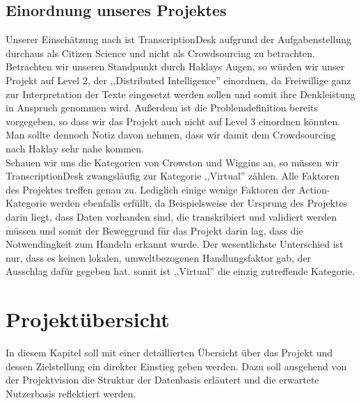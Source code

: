 \documentclass{article}
\begin{document}
\subsection{Einordnung unseres Projektes}
Unserer Einschätzung nach ist TranscriptionDesk aufgrund der Aufgabenstellung durchaus als Citizen Science und nicht als Crowdsourcing zu betrachten. Betrachten wir unseren Standpunkt durch Haklays Augen, so würden wir unser Projekt auf Level 2, der ,,Distributed Intelligence'' einordnen, da Freiwillige ganz zur Interpretation der Texte eingesetzt werden sollen und somit ihre Denkleistung in Anspruch genommen wird. Außerdem ist die Problemdefinition bereits vorgegeben, so dass wir das Projekt auch nicht auf Level 3 einordnen könnten. Man sollte dennoch Notiz davon nehmen, dass wir damit dem Crowdsourcing nach Haklay sehr nahe kommen.\\
Schauen wir uns die Kategorien von Crowston und Wiggins an, so müssen wir TranscriptionDesk zwangsläufig zur Kategorie ,,Virtual'' zählen. Alle Faktoren des Projektes treffen genau zu. Lediglich einige wenige Faktoren der Action-Kategorie werden ebenfalls erfüllt, da Beispielsweise der Ursprung des Projektes darin liegt, dass Daten vorhanden sind, die transkribiert und validiert werden müssen und somit der Beweggrund für das Projekt darin lag, dass die Notwendingkeit zum Handeln erkannt wurde. Der wesentlichste Unterschied ist nur, dass es keinen lokalen, umweltbezogenen Handlungsfaktor gab, der Ausschlag dafür gegeben hat. somit ist ,,Virtual'' die einzig zutreffende Kategorie.

\section{Projektübersicht}
In diesem Kapitel soll mit einer detaillierten Übersicht über das Projekt und dessen Zielstellung ein direkter Einstieg geben werden. Dazu soll ausgehend von der Projektvision die Struktur der Datenbasis erläutert und die erwartete Nutzerbasis reflektiert werden.
\end{document}
